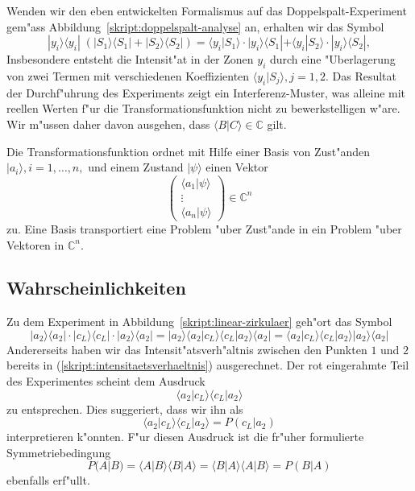 Wenden wir den eben entwickelten Formalismus auf das Doppelspalt-Experiment
gem"ass Abbildung~\ref{skript:doppelspalt-analyse} an, erhalten wir das Symbol
\[
|y_i\rangle \langle y_i|\; (|S_1\rangle\langle S_1| + |S_2\rangle \langle S_2|)
=
\langle y_i|S_1\rangle
\cdot
|y_i\rangle \langle S_1|
+
\langle y_i|S_2\rangle
\cdot
|y_i\rangle \langle S_2|,
\]
%
Insbesondere entsteht die Intensit"at in der Zonen $y_i$ durch eine
"Uberlagerung von zwei Termen mit verschiedenen
Koeffizienten $\langle y_i|S_j\rangle, j=1,2$.
%
Das Resultat der Durchf"uhrung des Experiments zeigt ein Interferenz-Muster,
was alleine mit reellen Werten f"ur die Transformationsfunktion nicht
zu bewerkstelligen w"are.
Wir m"ussen daher davon ausgehen, dass $\langle B|C\rangle\in\mathbb C$ gilt.

Die Transformationsfunktion ordnet mit Hilfe einer Basis von Zust"anden
$|a_i\rangle, i=1,\dots, n,$ und einem Zustand $|\psi\rangle$ einen Vektor
\[
\begin{pmatrix}
\langle a_1|\psi\rangle\\
\vdots\\
\langle a_n|\psi\rangle
\end{pmatrix}
\in\mathbb C^n
\]
zu.
Eine Basis transportiert eine Problem "uber Zust"ande in ein
Problem "uber Vektoren in $\mathbb C^n$.

\subsection{Wahrscheinlichkeiten}
%
Zu dem Experiment in Abbildung~\ref{skript:linear-zirkulaer} geh"ort das Symbol
\[
|a_2\rangle\langle a_2|\cdot
|c_L\rangle\langle c_L|\cdot
|a_2\rangle\langle a_2|
=
|a_2\rangle\langle a_2
|c_L\rangle\langle c_L
|a_2\rangle\langle a_2|
=
\langle a_2
|c_L\rangle\langle c_L
|a_2\rangle
|a_2\rangle
\langle a_2|
\]
Andererseits haben wir das Intensit"atsverh"altnis zwischen den Punkten
$1$ und $2$ bereits in (\ref{skript:intensitaetsverhaeltnis}) ausgerechnet.
Der rot eingerahmte Teil des Experimentes scheint dem Ausdruck
\[
\langle a_2
|c_L\rangle\langle c_L
|a_2\rangle
\]
zu entsprechen.
Dies suggeriert, dass wir ihn als
\[
\langle a_2
|c_L\rangle\langle c_L
|a_2\rangle
=
P(c_L|a_2) 
\]
interpretieren k"onnten. F"ur diesen Ausdruck ist die fr"uher formulierte
Symmetriebedingung 
\[
P(A|B)
=
\langle A |B\rangle
\langle B |A\rangle
=
\langle B |A\rangle
\langle A |B\rangle
=
P(B|A)
\]
ebenfalls erf"ullt.

